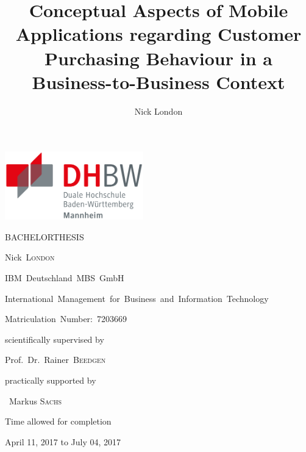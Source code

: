 \documentclass[12pt,a4paper,final,oneside,openright,onecolumn,titlepage]{scrbook}
\author{Nick London}
\title{Conceptual Aspects of Mobile Applications regarding Customer Purchasing Behaviour in a Business-to-Business Context}
\newcounter{savepage}
\begin{document}
\begin{titlepage}
	\includegraphics[height=8em]{img/logos/dhbw.pdf}
	\hfill
	\par
	\centering
	\vfill
	{\huge \textsc{\MakeUppercase{Bachelorthesis}}\par}
	\vspace{2em}
	{\Huge \textbf{\thetitle}\par}
	\vspace{1.5em}
	{\large Nick~\textsc{London}\par}
	\vfill
	{\small IBM~Deutschland~MBS~GmbH\par
	International~Management~for~Business~and~Information~Technology\par
	Matriculation~Number:~7203669}
	\vfill
	{scientifically supervised by\par Prof.~Dr.~Rainer~\textsc{Beedgen}\par}
	\par\vspace{1em}
	{practically supported by\par ~Markus \textsc{Sachs}\par}
	\vspace{2em}
	{Time allowed for completion\par April 11, 2017 to July 04, 2017\par}
\end{titlepage}

\setcounter{page}{1}

\tableofcontents

\newpage
{}
\listoffigures

\newpage
{}
\listoftables



\newpage

\setcounter{page}{1}
\end{document}
